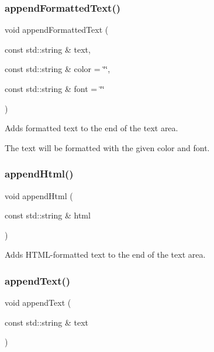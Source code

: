\subsubsection{\texorpdfstring{append\+Formatted\+Text()}{appendFormattedText()}}
{\footnotesize\ttfamily void append\+Formatted\+Text (\begin{DoxyParamCaption}\item[{const std\+::string \&}]{text,  }\item[{const std\+::string \&}]{color = {\ttfamily \char`\"{}\char`\"{}},  }\item[{const std\+::string \&}]{font = {\ttfamily \char`\"{}\char`\"{}} }\end{DoxyParamCaption})\hspace{0.3cm}{\ttfamily [virtual]}}



Adds formatted text to the end of the text area. 

The text will be formatted with the given color and font. \mbox{\label{classGTextArea_aa3457253e58dbfbf65a8f5a28c65fb5f}} 
\subsubsection{\texorpdfstring{append\+Html()}{appendHtml()}}
{\footnotesize\ttfamily void append\+Html (\begin{DoxyParamCaption}\item[{const std\+::string \&}]{html }\end{DoxyParamCaption})\hspace{0.3cm}{\ttfamily [virtual]}}



Adds H\+T\+M\+L-\/formatted text to the end of the text area. 

\mbox{\label{classGTextArea_a6ba815b59563007b60dc2052d4703146}} 
\subsubsection{\texorpdfstring{append\+Text()}{appendText()}}
{\footnotesize\ttfamily void append\+Text (\begin{DoxyParamCaption}\item[{const std\+::string \&}]{text }\end{DoxyParamCaption})\hspace{0.3cm}{\ttfamily [virtual]}}



